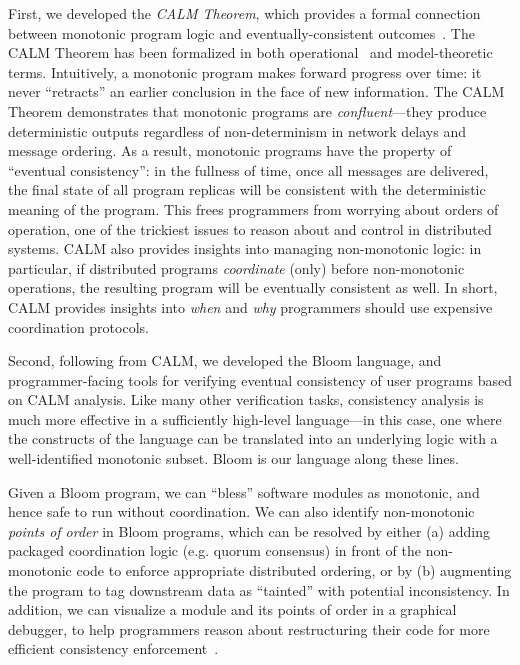 First, we developed the \emph{CALM Theorem}, which provides a formal connection between monotonic program logic and eventually-consistent outcomes~\cite{podskey}.  The CALM Theorem has been formalized in both operational~\cite{Ameloot2011,Abiteboul2011} and model-theoretic~\cite{marczak2012} terms.    Intuitively, a monotonic program makes forward progress over time: it never ``retracts'' an earlier conclusion in the face of new information.   The CALM Theorem demonstrates that monotonic programs are \emph{confluent}---they produce deterministic outputs regardless of non-determinism in network delays and message ordering.  As a result, monotonic programs have the property of ``eventual consistency'': in the fullness of time, once all messages are delivered, the final state of all program replicas will be consistent with the deterministic meaning of the program.  This frees programmers from worrying about orders of operation, one of the trickiest issues to reason about and control in distributed systems.  CALM also provides insights into managing non-monotonic logic: in particular, if distributed programs \emph{coordinate} (only) before non-monotonic operations, the resulting program will be eventually consistent as well.  In short, CALM provides insights into \emph{when} and \emph{why} programmers should use expensive coordination protocols.

Second, following from CALM, we developed the Bloom language, and programmer-facing tools for verifying eventual consistency of user programs based on CALM analysis. Like many other verification tasks, consistency analysis is much more effective in a sufficiently high-level language---in this case, one where the constructs of the language can be translated into an underlying logic with a well-identified monotonic subset. Bloom is our language along these lines. 

Given a Bloom program, we can ``bless'' software modules as monotonic, and hence safe to run without coordination.  We can also identify non-monotonic \emph{points of order} in Bloom programs, which can be resolved by either (a) adding packaged coordination logic (e.g. quorum consensus) in front of the non-monotonic code to enforce appropriate distributed ordering, or by (b) augmenting the program to tag downstream data as ``tainted'' with potential inconsistency.  In addition, we can visualize a module and its points of order in a graphical debugger, to help programmers reason about restructuring their code for more efficient consistency enforcement~\cite{bloom}.

